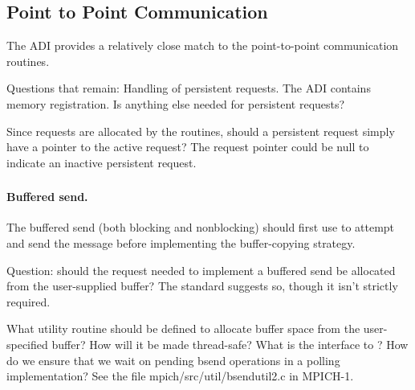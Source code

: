 \documentclass{article}
\begin{document}
\subsection{Point to Point Communication}

The ADI provides a relatively close match to the point-to-point
communication routines.  

Questions that remain:  Handling of persistent requests.  The ADI
contains memory registration.  Is anything else needed for persistent
requests? 

Since requests are allocated by the  routines,
should a persistent request simply have a pointer to the active request?  The
request pointer could be null to indicate an inactive persistent request.

\subsubsection{}
\begin{adi3}
\end{adi3}

\paragraph{Buffered send.}
The buffered send (both blocking and nonblocking) should first use
 to attempt 
and send the message before implementing the buffer-copying strategy.

Question: should the request needed to implement a buffered send be allocated
from the user-supplied buffer?  The standard suggests so, though it isn't
strictly required.

What utility routine should be defined to allocate buffer space from the
user-specified buffer?  How will it be made thread-safe?  What is the
interface to ?  How do we ensure that we wait on
pending bsend operations in a polling implementation?  See the file
mpich/src/util/bsendutil2.c in MPICH-1.

\subsubsection{}

\subsubsection{}
\end{document}
